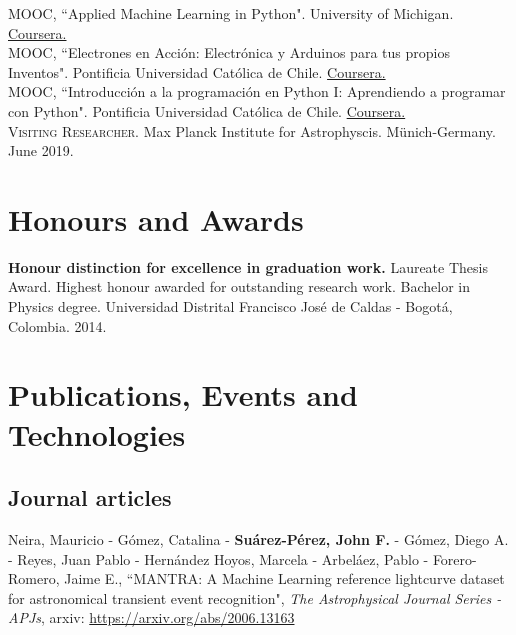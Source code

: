 \documentclass[10pt, a4paper]{article}
\newcommand{\years}[1]{\marginnote{\scriptsize #1}}
\begin{document}
\years{2020}\textsc{MOOC}, “Applied Machine Learning in Python". University of Michigan. \href{https://coursera.org/share/620fe326f4cc26b1f4a9bf77690114ae}{Coursera.}\\

\years{2019}\textsc{MOOC}, “Electrones en Acción: Electrónica y Arduinos para tus propios Inventos". Pontificia Universidad Católica de Chile. \href{https://www.coursera.org/account/accomplishments/certificate/W5M5CZ3XE557}{Coursera.}\\

\years{2019}\textsc{MOOC}, “Introducción a la programación en Python I: Aprendiendo a programar con Python". Pontificia Universidad Católica de Chile. \href{https://www.coursera.org/account/accomplishments/certificate/8UEF5TUY6ACB}{Coursera.}\\

\years{2019}\textsc{Visiting Researcher}. Max Planck Institute for Astrophyscis. Münich-Germany. {June 2019}.\\


\section*{Honours and Awards}
\noindent
\years{2014}\textbf{Honour distinction for excellence in graduation work.} Laureate Thesis Award. Highest honour awarded for outstanding research work. Bachelor in Physics degree. Universidad Distrital Francisco José de Caldas - Bogotá, Colombia. 2014.

\section*{Publications, Events and Technologies}

\subsection*{Journal articles}
\noindent
\years{2020}Neira, Mauricio - Gómez, Catalina - \textbf{Suárez-Pérez, John F.} - Gómez, Diego A. - Reyes, Juan Pablo - Hernández Hoyos, Marcela - Arbeláez, Pablo - Forero-Romero, Jaime E., “MANTRA: A Machine Learning reference lightcurve dataset for astronomical transient event recognition", \emph{The Astrophysical Journal Series - APJs}, arxiv: \url{https://arxiv.org/abs/2006.13163} 
\\
\end{document}
